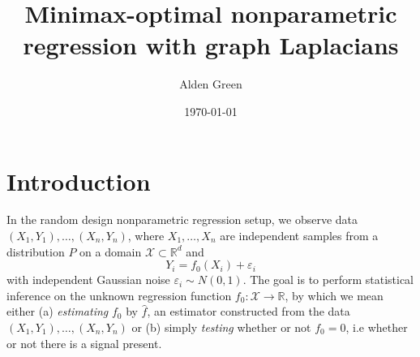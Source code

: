 \documentclass{article}
\newcommand{\Reals}{\mathbb{R}}
\newcommand{\1}{\mathbf{1}}
\newcommand{\Rd}{\Reals^d}
\newcommand{\Xset}{\mathcal{X}}
\newcommand{\wh}[1]{\widehat{#1}}
\theoremstyle{alden}
\theoremstyle{aldenthm}
\theoremstyle{definition}
\theoremstyle{remark}
\begin{document}
\title{Minimax-optimal nonparametric regression with graph Laplacians}
\author{Alden Green}
\date{\today}
\maketitle

\section{Introduction}

In the random design nonparametric regression setup, we observe data $(X_1,Y_1),\ldots,(X_n,Y_n)$, where $X_1,\ldots,X_n$ are independent samples from a distribution $P$ on a domain $\Xset \subset \Rd$ and 
\begin{equation}
\label{eqn:random_design_regression}
Y_i = f_0(X_i) + \varepsilon_i
\end{equation}
with independent Gaussian noise $\varepsilon_i \sim N(0,1)$. The goal is to perform statistical inference on the unknown regression function $f_0: \Xset \to \Reals$, by which we mean either (a) \emph{estimating} $f_0$ by $\wh{f}$, an estimator constructed from the data $(X_1,Y_1),\ldots,(X_n,Y_n)$ or (b) simply \emph{testing} whether or not $f_0 = 0$, i.e whether or not there is a signal present. 
\end{document}
